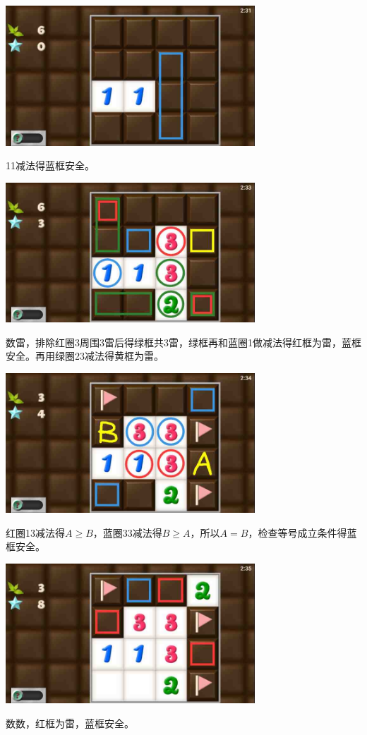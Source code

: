 \subsection{} %
\begin{center}
    \includegraphics[width=0.7\textwidth]{puzzlelow/149-1.jpg}
\end{center}
11减法得蓝框安全。
\begin{center}
    \includegraphics[width=0.7\textwidth]{puzzlelow/149-2.jpg}
\end{center}
数雷，排除红圈3周围3雷后得绿框共3雷，绿框再和蓝圈1做减法得红框为雷，蓝框安全。再用绿圈23减法得黄框为雷。
\begin{center}
    \includegraphics[width=0.7\textwidth]{puzzlelow/149-3.jpg}
\end{center}
红圈13减法得$A\ge B$，蓝圈33减法得$B\ge A$，所以$A=B$，检查等号成立条件得蓝框安全。
\begin{center}
    \includegraphics[width=0.7\textwidth]{puzzlelow/149-4.jpg}
\end{center}
数数，红框为雷，蓝框安全。

